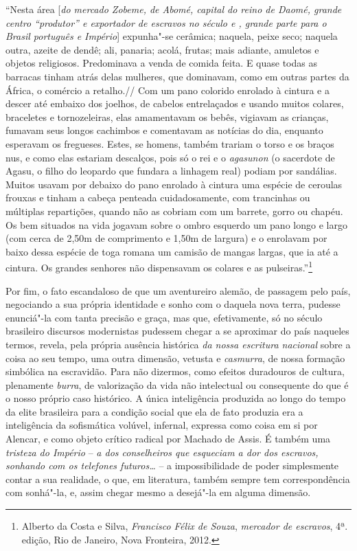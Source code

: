 ``Nesta área {[}\emph{do mercado Zobeme, de Abomé, capital do reino de
Daomé, grande centro ``produtor'' e exportador de escravos no século
 e , grande parte para o Brasil português e Império}{]}
expunha"-se cerâmica; naquela, peixe seco; naquela outra, azeite de
dendê; ali, panaria; acolá, frutas; mais adiante, amuletos e objetos
religiosos. Predominava a venda de comida feita. E quase todas as
barracas tinham atrás delas mulheres, que dominavam, como em outras
partes da África, o comércio a retalho.// Com um pano colorido enrolado
à cintura e a descer até embaixo dos joelhos, de cabelos entrelaçados e
usando muitos colares, braceletes e tornozeleiras, elas amamentavam os
bebês, vigiavam as crianças, fumavam seus longos cachimbos e comentavam
as notícias do dia, enquanto esperavam os fregueses. Estes, se homens,
também trariam o torso e os braços nus, e como elas estariam descalços,
pois só o rei e o \emph{agasunon} (o sacerdote de Agasu, o filho do
leopardo que fundara a linhagem real) podiam por sandálias. Muitos
usavam por debaixo do pano enrolado à cintura uma espécie de ceroulas
frouxas e tinham a cabeça penteada cuidadosamente, com trancinhas ou
múltiplas repartições, quando não as cobriam com um barrete, gorro ou
chapéu. Os bem situados na vida jogavam sobre o ombro esquerdo um pano
longo e largo (com cerca de 2,50m de comprimento e 1,50m de largura) e o
enrolavam por baixo dessa espécie de toga romana um camisão de mangas
largas, que ia até a cintura. Os grandes senhores não dispensavam os
colares e as pulseiras.''\footnote{Alberto da Costa e Silva,
  \emph{Francisco Félix de Souza}, \emph{mercador de escravos}, 4ª.
  edição, Rio de Janeiro, Nova Fronteira, 2012.}

Por fim, o fato escandaloso de que um aventureiro alemão, de passagem
pelo país, negociando a sua própria identidade e sonho com o daquela
nova terra, pudesse enunciá"-la com tanta precisão e graça, mas que,
efetivamente, só no século  brasileiro discursos modernistas pudessem
chegar a se aproximar do país naqueles termos, revela, pela própria
ausência histórica \emph{da nossa escritura nacional} sobre a coisa ao
seu tempo, uma outra dimensão, vetusta e \emph{casmurra}, de nossa
formação simbólica na escravidão. Para não dizermos, como efeitos
duradouros de cultura, plenamente \emph{burra}, de valorização da vida
não intelectual ou consequente do que é o nosso próprio caso histórico.
A única inteligência produzida ao longo do tempo da elite brasileira
para a condição social que ela de fato produzia era a inteligência da
sofismática volúvel, infernal, expressa como coisa em si por Alencar, e
como objeto crítico radical por Machado de Assis. É também uma
\emph{tristeza do Império} -- \emph{a dos conselheiros que esqueciam a
dor dos escravos, sonhando com os telefones futuros\ldots{}} -- a
impossibilidade de poder simplesmente contar a sua realidade, o que, em
literatura, também sempre tem correspondência com sonhá"-la, e, assim
chegar mesmo a desejá"-la em alguma dimensão.


